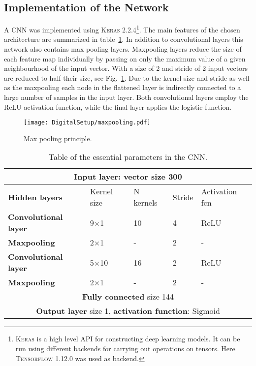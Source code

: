 \documentclass[main.tex]{subfiles}
\begin{document}
\subsection{Implementation of the Network}
A CNN was implemented using \textsc{Keras} 2.2.4\footnote{\textsc{Keras} is a high level API for constructing deep learning models. It can be run using different backends for carrying out operations on tensors. Here \textsc{Tensorflow} 1.12.0 was used as backend.}\cite{keras}. The main features of the chosen architecture are summarized in table~\ref{tab:architecture}. In addition to convolutional layers this network also contains max pooling layers. Maxpooling layers reduce the size of each feature map individually by passing on only the maximum value of a given neighbourhood of the input vector. With a size of 2 and stride of 2 input vectors are reduced to half their size, see Fig.~\ref{fig:maxpooking}. Due to the kernel size and stride as well as the maxpooling each node in the flattened layer is indirectly connected to a large number of samples in the input layer. Both convolutional layers employ the ReLU activation function, while the final layer applies the logistic function.
\begin{figure}[ht!]
    \centering
        \texttt{[image: DigitalSetup/maxpooling.pdf]}
        \caption[Max pooling principle]{Max pooling principle.}
    \label{fig:maxpooking} 
\end{figure}

\begin{table}[h]
\center
\begin{tabular}{|l|l|l|l|l|}
\hline
\multicolumn{5}{|c|}{\textbf{Input layer}: vector size 300}                                            \\ \hline
\textbf{Hidden layers}       & Kernel size & N kernels & Stride & Activation fcn \\ \hline
\textbf{Convolutional layer} & 9$\times$1           & 10                & 4             & ReLU                \\ \hline
\textbf{Maxpooling}          & 2$\times$1           & -                 & 2             & -                   \\ \hline
\textbf{Convolutional layer} & 5$\times$10           & 16                & 2             & ReLU                \\ \hline
\textbf{Maxpooling}          & 2$\times$1           & -                 & 2             & -                   \\ \hline
\multicolumn{5}{|c|}{\textbf{Fully connected} size 144}
\\ \hline
\multicolumn{5}{|c|}{\textbf{Output layer} size 1, \textbf{activation function}: Sigmoid}               \\ \hline
\end{tabular}
\caption{Table of the essential parameters in the CNN.}
\label{tab:architecture}
\end{table}
\end{document}

